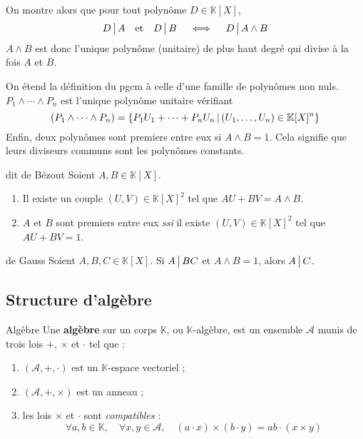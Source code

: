     On montre alors que pour tout polynôme $D \in \mathbb{K}[X]$, 
    \[ D \, \big| \, A \quad \text{et} \quad D \, \big| \, B \quad \iff \quad D \, \big| \, A \wedge B \]   
    $A \wedge B$ est donc l’unique polynôme (unitaire) de plus haut degré qui divise à la fois $A$ et $B$.

    On étend la définition du pgcm à celle d’une famille de polynômes non nuls. $P_1 \wedge \cdots \wedge P_n$ est l’unique polynôme unitaire vérifiant 
    \[ (P_1 \wedge \cdots \wedge P_n) = \left\{P_1 U_1 + \cdots + P_n U_n \, \middle| \, (U_1,\ldots,U_n) \in \mathbb{K}[X]^n\right\} \]
    Enfin, deux polynômes sont premiers entre eux si $A \wedge B = 1$. Cela signifie que leurs diviseurs communs sont les polynômes constants.

    \begin{theo}{dit de Bézout}{}
        Soient $A,B \in \mathbb{K}[X]$.
        \begin{enumerate}
            \item Il existe un couple $(U,V) \in \mathbb{K}[X]^2$ tel que $AU + BV = A \wedge B$.
            \item $A$ et $B$ sont premiers entre eux \textit{ssi} il existe $(U,V) \in \mathbb{K}[X]^2$ tel que $AU + BV = 1$.
        \end{enumerate}
    \end{theo}

    \begin{lem}{de Gauss}{}
        Soient $A,B,C \in \mathbb{K}[X]$. Si $A \, \big| \, BC$ et $A \wedge B = 1$, alors $A \, \big| \, C$.
    \end{lem}

\subsection{Structure d’algèbre}

    \begin{defi}{Algèbre}{}
        Une \textbf{algèbre} sur un corps $\mathbb{K}$, ou $\mathbb{K}$-algèbre, est un ensemble $\mathcal{A}$ munis de trois lois $+$, $\times$ et $\cdotp$ tel que :
        \begin{enumerate}[label=$(h_{\alph*})$]
            \item $(\mathcal{A}, +, \cdotp)$ est un $\mathbb{K}$-espace vectoriel ;
            \item $(\mathcal{A}, +, \times)$ est un anneau ;
            \item les lois $\times$ et $\cdotp$ sont \textit{compatibles} :
            \[ \forall a,b \in \mathbb{K}, \quad \forall x,y \in \mathcal{A}, \quad (a \cdotp x) \times (b \cdotp y) = ab \cdotp (x \times y) \]   
        \end{enumerate}
    \end{defi}

